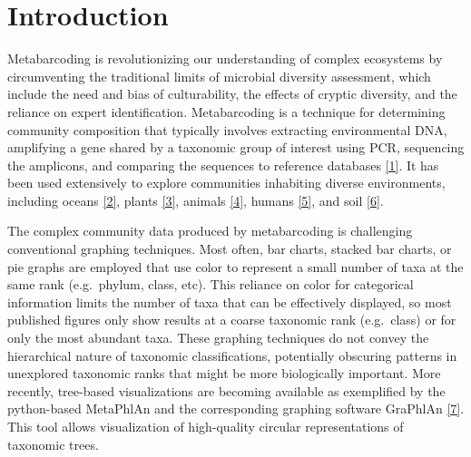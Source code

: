 \documentclass[10pt,letterpaper]{article}
\begin{document}
\linenumbers



\section*{Introduction}\label{introduction}

Metabarcoding is revolutionizing our understanding of complex ecosystems
by circumventing the traditional limits of microbial diversity
assessment, which include the need and bias of culturability, the
effects of cryptic diversity, and the reliance on expert identification.
Metabarcoding is a technique for determining community composition that
typically involves extracting environmental DNA, amplifying a gene
shared by a taxonomic group of interest using PCR, sequencing the
amplicons, and comparing the sequences to reference databases
\hyperref[csl:1]{[1]}. It has been used extensively to explore
communities inhabiting diverse environments, including oceans
\hyperref[csl:2]{[2]}, plants \hyperref[csl:3]{[3]}, animals
\hyperref[csl:4]{[4]}, humans \hyperref[csl:5]{[5]}, and soil
\hyperref[csl:6]{[6]}.

The complex community data produced by metabarcoding is challenging
conventional graphing techniques. Most often, bar charts, stacked bar
charts, or pie graphs are employed that use color to represent a small
number of taxa at the same rank (e.g.~phylum, class, etc). This reliance
on color for categorical information limits the number of taxa that can
be effectively displayed, so most published figures only show results at
a coarse taxonomic rank (e.g.~class) or for only the most abundant taxa.
These graphing techniques do not convey the hierarchical nature of
taxonomic classifications, potentially obscuring patterns in unexplored
taxonomic ranks that might be more biologically important. More
recently, tree-based visualizations are becoming available as
exemplified by the python-based MetaPhlAn and the corresponding graphing
software GraPhlAn \hyperref[csl:7]{[7]}. This tool allows
visualization of high-quality circular representations of taxonomic
trees.
\end{document}
